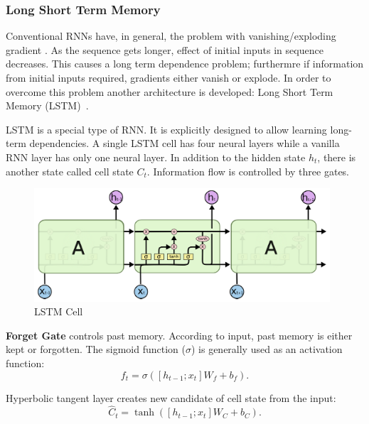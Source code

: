 \subsubsection{Long Short Term Memory}

Conventional RNNs have, in general, the problem with vanishing/exploding gradient \cite{olah_understanding_2015}. 
As the sequence gets longer, effect of initial inputs in sequence decreases. 
This causes a long term dependence problem; furthermre if information from initial inputs required, gradients either vanish or explode. 
In order to overcome this problem another architecture is developed: Long Short Term Memory (LSTM)~\cite{hochreiter_long_1997}. 

LSTM is a special type of RNN. 
It is explicitly designed to allow learning long-term dependencies. 
A single LSTM cell has four neural layers while a vanilla RNN layer has only one neural layer. 
In addition to the hidden state $h_t$, there is another state called cell state $C_t$. 
Information flow is controlled by three gates. 

\begin{figure}
	\centering
	\includegraphics[width=0.98\textwidth]{figures/ml_theory/lstm/lstm_module.png}
	\caption{LSTM Cell~\cite{olah_understanding_2015}}
	\label{fig:lstm_cell}
\end{figure}

\textbf{Forget Gate} controls past memory. 
According to input, past memory is either kept or forgotten. 
The sigmoid function ($\sigma$) is generally used as an activation function: 
\begin{equation}
\label{eqn:lstm_forget}
f_t = \sigma( [h_{t-1}; x_t] W_f + b_f).
\end{equation}

Hyperbolic tangent layer creates new candidate of cell state from the input:  
\begin{equation}
\label{eqn:lstm_cellstcand}
\hat{C}_t = \tanh( [h_{t-1}; x_t] W_C + b_C).
\end{equation}

